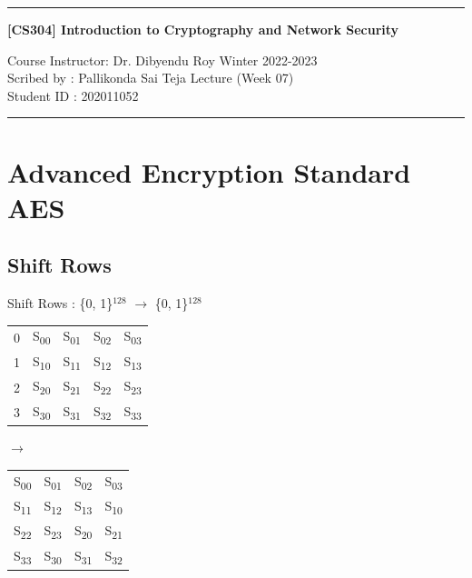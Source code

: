 \documentclass[11pt]{article}
\begin{document}
	\noindent
	\rule{\textwidth}{1pt}
	\begin{center}
		{\bf [CS304] Introduction to Cryptography and Network Security}
	\end{center}
	Course Instructor: Dr. Dibyendu Roy \hfill Winter 2022-2023\\
	Scribed by : Pallikonda Sai Teja  \hfill Lecture (Week 07)\\
	Student ID : 202011052\\
	\rule{\textwidth}{1pt}
	\section{Advanced Encryption Standard AES}
	\subsection{Shift Rows}
	Shift Rows : \{0, 1\}$^{128}$ $\rightarrow$ \{0, 1\}$^{128}$\vspace{0.2cm}\\
	\begin{tabular}{c | c c c c |}
		0&S\textsubscript{00} & S\textsubscript{01} & S\textsubscript{02} & S\textsubscript{03}\\
		1&S\textsubscript{10} & S\textsubscript{11} & S\textsubscript{12} & S\textsubscript{13}\\
		2&S\textsubscript{20} & S\textsubscript{21} & S\textsubscript{22} & S\textsubscript{23}\\
		3&S\textsubscript{30} & S\textsubscript{31} & S\textsubscript{32} & S\textsubscript{33}
	\end{tabular}\hspace{0.2cm}$\rightarrow$\hspace{0.2cm}
	\begin{tabular}{| c c c c |}
		S\textsubscript{00} & S\textsubscript{01} & S\textsubscript{02} & S\textsubscript{03}\\
		S\textsubscript{11} & S\textsubscript{12} & S\textsubscript{13} & S\textsubscript{10}\\
		S\textsubscript{22} & S\textsubscript{23} & S\textsubscript{20} & S\textsubscript{21}\\
		S\textsubscript{33} & S\textsubscript{30} & S\textsubscript{31} & S\textsubscript{32}
	\end{tabular}
	
\end{document}
